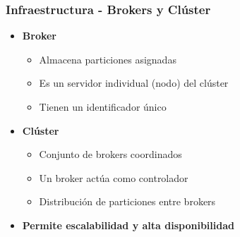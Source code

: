 \documentclass[aspectratio=169]{beamer}
\begin{document}
\begin{frame}\frametitle{Infraestructura - Brokers y Clúster}
\begin{itemize}
  \item \textbf{Broker}
  \begin{itemize}
    \item Almacena particiones asignadas
    \item Es un servidor individual (nodo) del clúster
    \item Tienen un identificador único
  \end{itemize}

  \vspace{1em}

  \item \textbf{Clúster}
  \begin{itemize}
    \item Conjunto de brokers coordinados
    \item Un broker actúa como controlador
    \item Distribución de particiones entre brokers
  \end{itemize}

  \vspace{1em}

  \item \textbf{Permite escalabilidad y alta disponibilidad}
\end{itemize}
\end{frame}
\end{document}
